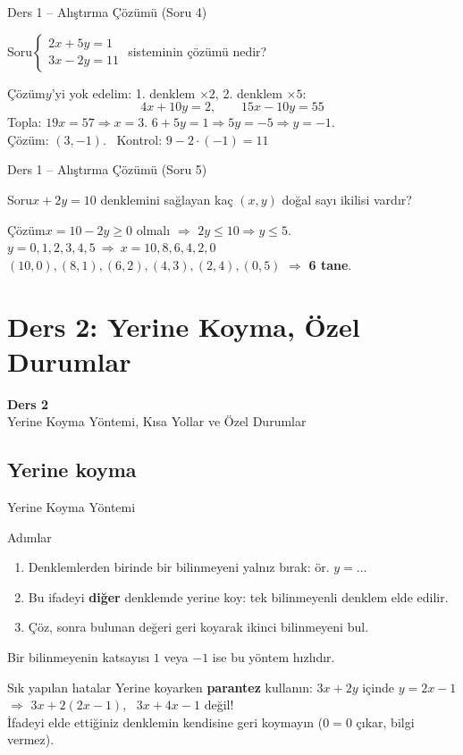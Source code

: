 \documentclass[aspectratio=169,11pt,handout]{beamer}
\newcommand{\soru}[3]{%
\begin{frame}{#1}
  \begin{block}{Soru}\large #2\end{block}
  \pause
  \begin{exampleblock}{Çözüm}\large #3\end{exampleblock}
\end{frame}}
\begin{document}
\soru{Ders 1 -- Alıştırma Çözümü (Soru 4)}
{\(\begin{cases}2x+5y=1\\ 3x-2y=11\end{cases}\) \quad sisteminin çözümü nedir?}
{\(y\)'yi yok edelim: 1. denklem \(\times 2\), 2. denklem \(\times 5\):
\[4x+10y=2,\qquad 15x-10y=55\]
Topla: \(19x=57\Rightarrow x=3\). \quad \(6+5y=1\Rightarrow 5y=-5\Rightarrow y=-1\).\\[3pt]
Çözüm: \((3,-1)\). \ Kontrol: \(9-2\cdot(-1)=11\) \checkmark}

\soru{Ders 1 -- Alıştırma Çözümü (Soru 5)}
{\(x+2y=10\) denklemini sağlayan kaç \((x,y)\) doğal sayı ikilisi vardır?}
{\(x=10-2y\ge 0\) olmalı \(\Rightarrow\) \(2y\le 10\Rightarrow y\le 5\).\\[3pt]
\(y=0,1,2,3,4,5\ \Rightarrow\ x=10,8,6,4,2,0\)\\[3pt]
\((10,0),(8,1),(6,2),(4,3),(2,4),(0,5)\) \(\Rightarrow\) \textbf{6 tane}.}

\section{Ders 2: Yerine Koyma, Özel Durumlar}
\begin{frame}
\centering\Large\color{anamavi}\textbf{Ders 2}\\[6pt]\normalsize Yerine Koyma Yöntemi, Kısa Yollar ve Özel Durumlar
\end{frame}

\subsection{Yerine koyma}
\begin{frame}{Yerine Koyma Yöntemi}
\begin{block}{Adımlar}
\begin{enumerate}
\item Denklemlerden birinde bir bilinmeyeni yalnız bırak: ör. \(y=\dots\)
\item Bu ifadeyi \textbf{diğer} denklemde yerine koy: tek bilinmeyenli denklem elde edilir.
\item Çöz, sonra bulunan değeri geri koyarak ikinci bilinmeyeni bul.
\end{enumerate}
Bir bilinmeyenin katsayısı \(1\) veya \(-1\) ise bu yöntem hızlıdır.
\end{block}
\begin{alertblock}{Sık yapılan hatalar}
Yerine koyarken \textbf{parantez} kullanın: \(3x+2y\) içinde \(y=2x-1\) \(\Rightarrow\) \(3x+2(2x-1)\), \ \(3x+4x-1\) değil!\\
İfadeyi elde ettiğiniz denklemin kendisine geri koymayın (\(0=0\) çıkar, bilgi vermez).
\end{alertblock}
\end{frame}
\end{document}
